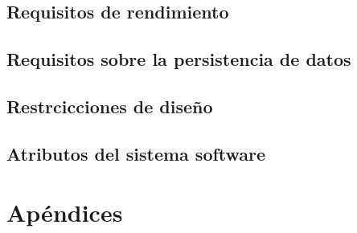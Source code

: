 \documentclass{article}
\begin{document}
\subsection{Requisitos de rendimiento}
\subsection{Requisitos sobre la persistencia de datos}
\subsection{Restrcicciones de diseño}
\subsection{Atributos del sistema software}

\section*{Apéndices}
\end{document}
